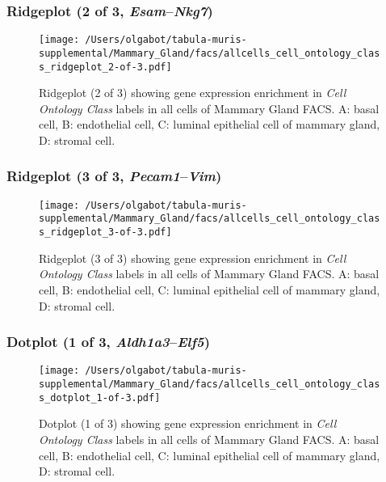 \clearpage

\subsubsection{Ridgeplot (2 of 3, \emph{Esam}--\emph{Nkg7})}
\begin{figure}[h]
\centering
\texttt{[image: /Users/olgabot/tabula-muris-supplemental/Mammary\_Gland/facs/allcells\_cell\_ontology\_class\_ridgeplot\_2-of-3.pdf]}

\caption{ Ridgeplot (2 of 3)  showing gene expression enrichment in \emph{Cell Ontology Class} labels in all cells of Mammary Gland FACS. A: basal cell, B: endothelial cell, C: luminal epithelial cell of mammary gland, D: stromal cell.}
\end{figure}


\clearpage

\subsubsection{Ridgeplot (3 of 3, \emph{Pecam1}--\emph{Vim})}
\begin{figure}[h]
\centering
\texttt{[image: /Users/olgabot/tabula-muris-supplemental/Mammary\_Gland/facs/allcells\_cell\_ontology\_class\_ridgeplot\_3-of-3.pdf]}

\caption{ Ridgeplot (3 of 3)  showing gene expression enrichment in \emph{Cell Ontology Class} labels in all cells of Mammary Gland FACS. A: basal cell, B: endothelial cell, C: luminal epithelial cell of mammary gland, D: stromal cell.}
\end{figure}


\clearpage

\subsubsection{Dotplot (1 of 3, \emph{Aldh1a3}--\emph{Elf5})}
\begin{figure}[h]
\centering
\texttt{[image: /Users/olgabot/tabula-muris-supplemental/Mammary\_Gland/facs/allcells\_cell\_ontology\_class\_dotplot\_1-of-3.pdf]}

\caption{ Dotplot (1 of 3)  showing gene expression enrichment in \emph{Cell Ontology Class} labels in all cells of Mammary Gland FACS. A: basal cell, B: endothelial cell, C: luminal epithelial cell of mammary gland, D: stromal cell.}
\end{figure}


